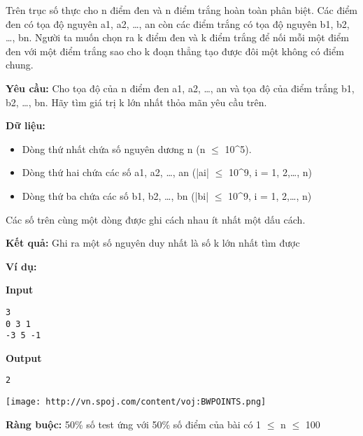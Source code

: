 

Trên trục số thực cho n điểm đen và n điểm trắng hoàn toàn phân biệt. Các điểm đen có tọa độ nguyên a1, a2, …, an còn các điểm trắng có tọa độ nguyên b1, b2, …, bn. Người ta muốn chọn ra k điểm đen và k điểm trắng để nối mỗi một điểm đen với một điểm trắng sao cho k đoạn thẳng tạo được đôi một không có điểm chung.

\textbf{Yêu cầu: } Cho tọa độ của n điểm đen a1, a2, …, an và tọa độ của điểm trắng b1, b2, …, bn. Hãy tìm giá trị k lớn nhất thỏa mãn yêu cầu trên.

\textbf{Dữ liệu: }
\begin{itemize}
	\item Dòng thứ nhất chứa số nguyên dương n (n  $\le$  10\textasciicircum5).
	\item Dòng thứ hai chứa các số a1, a2, …, an (|ai|  $\le$  10\textasciicircum9, i = 1, 2,…, n)
	\item Dòng thứ ba chứa các số b1, b2, …, bn (|bi|  $\le$  10\textasciicircum9, i = 1, 2,…, n)
\end{itemize}

Các số trên cùng một dòng được ghi cách nhau ít nhất một dấu cách.

\textbf{Kết quả: } Ghi ra một số nguyên duy nhất là số k lớn nhất tìm được

\textbf{Ví dụ: }

\textbf{Input}
\begin{verbatim}
3
0 3 1
-3 5 -1\end{verbatim}

\textbf{Output}
\begin{verbatim}
2\end{verbatim}


\texttt{[image: http://vn.spoj.com/content/voj:BWPOINTS.png]}

\textbf{Ràng buộc: } 50\% số test ứng với 50\% số điểm của bài có 1  $\le$  n  $\le$  100
